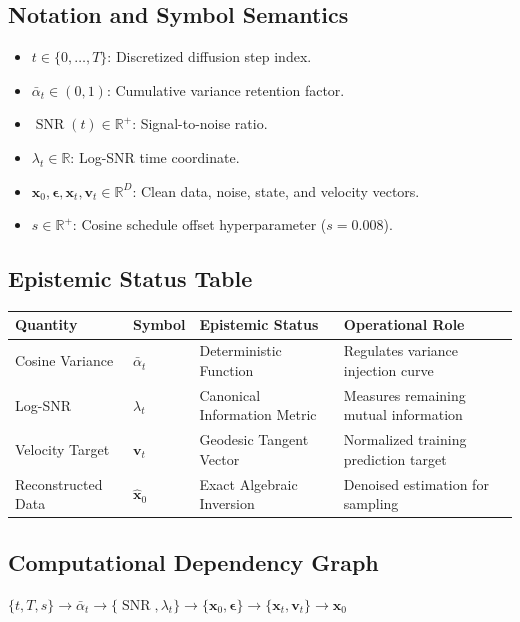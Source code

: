 \documentclass[11pt,a4paper]{article}
\theoremstyle{definition}
\begin{document}
\subsection{Notation and Symbol Semantics}
\begin{itemize}
    \item $t \in \{0, \dots, T\}$: Discretized diffusion step index.
    \item $\bar{\alpha}_t \in (0, 1)$: Cumulative variance retention factor.
    \item $\operatorname{SNR}(t) \in \mathbb{R}^+$: Signal-to-noise ratio.
    \item $\lambda_t \in \mathbb{R}$: Log-SNR time coordinate.
    \item $\mathbf{x}_0, \boldsymbol{\epsilon}, \mathbf{x}_t, \mathbf{v}_t \in \mathbb{R}^D$: Clean data, noise, state, and velocity vectors.
    \item $s \in \mathbb{R}^+$: Cosine schedule offset hyperparameter ($s = 0.008$).
\end{itemize}

\subsection{Epistemic Status Table}
\begin{table}[h]
\centering
\small
\begin{tabular}{@{}llll@{}}
\toprule
\textbf{Quantity} & \textbf{Symbol} & \textbf{Epistemic Status} & \textbf{Operational Role} \\
\midrule
Cosine Variance & $\bar{\alpha}_t$ & Deterministic Function & Regulates variance injection curve \\
Log-SNR & $\lambda_t$ & Canonical Information Metric & Measures remaining mutual information \\
Velocity Target & $\mathbf{v}_t$ & Geodesic Tangent Vector & Normalized training prediction target \\
Reconstructed Data & $\hat{\mathbf{x}}_0$ & Exact Algebraic Inversion & Denoised estimation for sampling \\
\bottomrule
\end{tabular}
\end{table}

\subsection{Computational Dependency Graph}
{\centering
$\{t, T, s\} \longrightarrow \bar{\alpha}_t \longrightarrow \{\operatorname{SNR}, \lambda_t\} \longrightarrow \{\mathbf{x}_0, \boldsymbol{\epsilon}\} \longrightarrow \{\mathbf{x}_t, \mathbf{v}_t\} \longrightarrow \hat{\mathbf{x}}_0$
\par}
\end{document}
